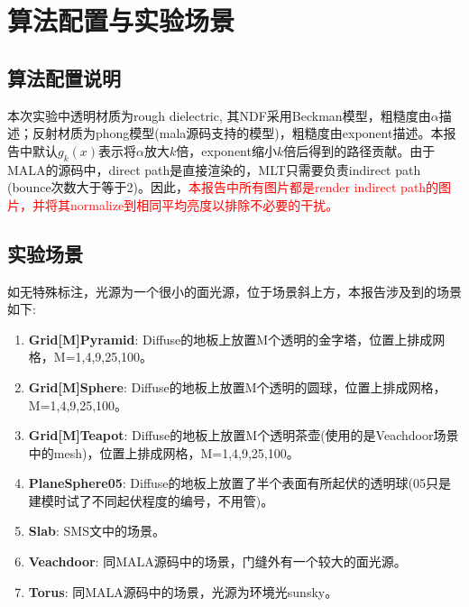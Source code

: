 \section{算法配置与实验场景}
\label{sec:desc}
\subsection{算法配置说明}
本次实验中透明材质为rough dielectric, 其NDF采用Beckman模型，粗糙度由$\alpha$描述；反射材质为phong模型(mala源码支持的模型)，粗糙度由exponent描述。本报告中默认$g_k(x)$表示将$\alpha$放大$k$倍，exponent缩小$k$倍后得到的路径贡献。由于MALA的源码中，direct path是直接渲染的，MLT只需要负责indirect path (bounce次数大于等于2)。因此，\textcolor{red}{本报告中所有图片都是render indirect path的图片，并将其normalize到相同平均亮度以排除不必要的干扰。}

\subsection{实验场景}
如无特殊标注，光源为一个很小的面光源，位于场景斜上方，本报告涉及到的场景如下:

\begin{enumerate}[(1)]
    \item \textbf{Grid[M]Pyramid}: Diffuse的地板上放置M个透明的金字塔，位置上排成网格，M=1,4,9,25,100。
    \item \textbf{Grid[M]Sphere}: Diffuse的地板上放置M个透明的圆球，位置上排成网格，M=1,4,9,25,100。
    \item \textbf{Grid[M]Teapot}: Diffuse的地板上放置M个透明茶壶(使用的是Veachdoor场景中的mesh)，位置上排成网格，M=1,4,9,25,100。
    \item \textbf{PlaneSphere05}: Diffuse的地板上放置了半个表面有所起伏的透明球(05只是建模时试了不同起伏程度的编号，不用管)。
    \item \textbf{Slab}: SMS文中的场景。
    \item \textbf{Veachdoor}: 同MALA源码中的场景，门缝外有一个较大的面光源。
    \item \textbf{Torus}: 同MALA源码中的场景，光源为环境光sunsky。
\end{enumerate}






